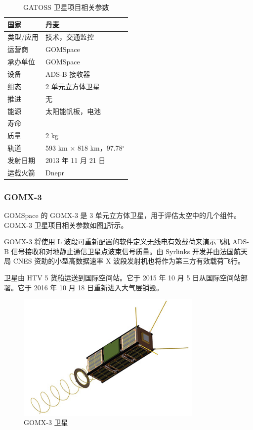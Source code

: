 
\renewcommand\arraystretch{1.5}
\begin{table}[!htb]
\centering
\caption{GATOSS 卫星项目相关参数\protect\footnotemark}
\label{tab:gatoss_satellite_program}
\begin{tabular}[b]{|p{3cm}<{\raggedleft}|p{6cm}<{\raggedright}|}
\hline
国家 & 丹麦  \\
\hline
类型/应用 &  技术，交通监控  \\
\hline
运营商 &  GOMSpace  \\
\hline
承办单位 &  GOMSpace  \\
\hline
设备 & ADS-B 接收器  \\
\hline
组态 & 2 单元立方体卫星  \\
\hline
推进 & 无 \\
\hline
能源 & 太阳能帆板，电池  \\
\hline
寿命 &  \\
\hline
质量 & 2 kg  \\
\hline
轨道 & 593 km × 818 km，97.78$^\circ$  \\
\hline
发射日期 & 2013 年 11 月 21 日 \\
\hline
运载火箭 & Dnepr \\
\hline
\end{tabular}
\end{table}


\subsubsection{GOMX-3}

GOMSpace 的 GOMX-3 是 3 单元立方体卫星，用于评估太空中的几个组件。GOMX-3 卫星项目相关参数如图\ref{fig:gomx-3__1}所示。

GOMX-3 将使用 L 波段可重新配置的软件定义无线电有效载荷来演示飞机 ADS-B 信号接收和对地静止通信卫星点波束信号质量。由 Syrlinks 开发并由法国航天局 CNES 资助的小型高数据速率 X 波段发射机也将作为第三方有效载荷飞行。

卫星由 HTV 5 货船运送到国际空间站。它于 2015 年 10 月 5 日从国际空间站部署。它于 2016 年 10 月 18 日重新进入大气层销毁。

\begin{figure}[!htb]
\centering
\includegraphics[width=9cm]{pic/gomx-3__1.jpg}
\caption{GOMX-3 卫星\protect\footnotemark}
\label{fig:gomx-3__1}
\end{figure}

